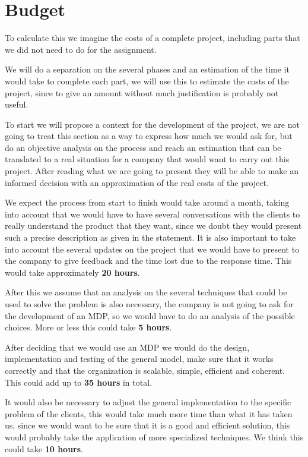 \documentclass[12pt]{article}
\begin{document}
\section{Budget}
\label{sec:org4a09b42}
To calculate this we imagine the costs of a complete project, including parts that we did not need to do for the assignment.\bigskip

We will do a separation on the several phases and an estimation of the time it would take to complete each part, we will use this to estimate the costs of the project, since to give an amount without much justification is probably not useful.\bigskip

To start we will propose a context for the development of the project, we are not going to treat this section as a way to express how much we would ask for, but do an objective analysis on the process and reach an estimation that can be translated to a real situation for a company that would want to carry out this project.  After reading what we are going to present they will be able to make an informed decision with an approximation of the real costs of the project.\bigskip

We expect the process from start to finish would take around a month, taking into account that we would have to have several conversations with the clients to really understand the product that they want, since we doubt they would present such a precise description as given in the statement. It is also important to take into account the several updates on the project that we would have to present to the company to give feedback and the time lost due to the response time. This would take approximately \textbf{20 hours}.\bigskip

After this we assume that an analysis on the several techniques that could be used to solve the problem is also necessary, the company is not going to ask for the development of an MDP, so we would have to do an analysis of the possible choices. More or less this could take \textbf{5 hours}.\bigskip

After deciding that we would use an MDP we would do the design, implementation and testing of the general model, make sure that it works correctly and that the organization is scalable, simple, efficient and coherent. This could add up to \textbf{35 hours} in total.\bigskip

It would also be necessary to adjust the general implementation to the specific problem of the clients, this would take much more time than what it has taken us, since we would want to be sure that it is a good and efficient solution, this would probably take the application of more specialized techniques. We think this could take \textbf{10 hours}.\bigskip
\end{document}
